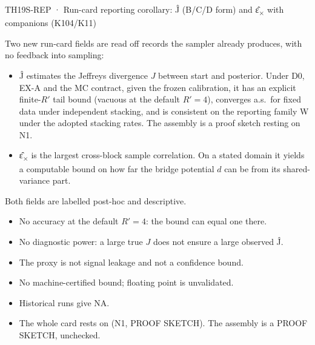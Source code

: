 \begin{card}{TH19}{S-REP · Run-card reporting corollary: Ĵ (B/C/D form) and ε̂\textsubscript{×} with companions (K104/K11)}
\begin{plain}
Two new run-card fields are read off records the sampler already produces, with no feedback into sampling:
\begin{itemize}
\item Ĵ estimates the Jeffreys divergence $J$ between start and posterior. Under D0, EX-A and the MC contract, given the frozen calibration, it has an explicit finite-$R'$ tail bound (vacuous at the default $R'=4$), converges a.s.\ for fixed data under independent stacking, and is consistent on the reporting family W under the adopted stacking rates. The assembly is a proof sketch resting on N1.
\item ε̂\textsubscript{×} is the largest cross-block sample correlation. On a stated domain it yields a computable bound on how far the bridge potential $d$ can be from its shared-variance part.
\end{itemize}
Both fields are labelled post-hoc and descriptive.
\end{plain}
\begin{notproved}
\begin{itemize}
\item No accuracy at the default $R'=4$: the bound can equal one there.
\item No diagnostic power: a large true $J$ does not ensure a large observed Ĵ.
\item The proxy is not signal leakage and not a confidence bound.
\item No machine-certified bound; floating point is unvalidated.
\item Historical runs give NA.
\item The whole card rests on  (N1, PROOF SKETCH). The assembly is a PROOF SKETCH, unchecked.
\end{itemize}
\end{notproved}
\end{card}

